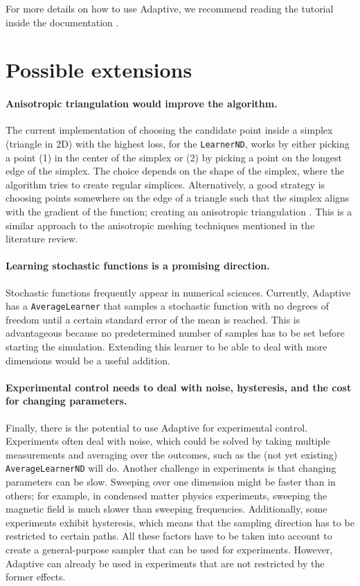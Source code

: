 \documentclass[english, twocolumn, 10pt, aps, superscriptaddress, floatfix, prb, citeautoscript]{revtex4-1}
\renewcommand{\citep}{\cite}
\newcommand{\passthrough}[1]{\lstset{mathescape=false}#1\lstset{mathescape=true}}
\begin{document}
For more details on how to use Adaptive, we recommend reading the tutorial inside the documentation \citep{Nijholt2018}.

\section{Possible extensions}

\paragraph{Anisotropic triangulation would improve the algorithm.}

The current implementation of choosing the candidate point inside a simplex (triangle in 2D) with the highest loss, for the \passthrough{\lstinline!LearnerND!}, works by either picking a point (1) in the center of the simplex or (2) by picking a point on the longest edge of the simplex.
The choice depends on the shape of the simplex, where the algorithm tries to create regular simplices.
Alternatively, a good strategy is choosing points somewhere on the edge of a triangle such that the simplex aligns with the gradient of the function; creating an anisotropic triangulation \citep{Dyn1990}.
This is a similar approach to the anisotropic meshing techniques mentioned in the literature review.

\paragraph{Learning stochastic functions is a promising direction.}

Stochastic functions frequently appear in numerical sciences.
Currently, Adaptive has a \passthrough{\lstinline!AverageLearner!} that samples a stochastic function with no degrees of freedom until a certain standard error of the mean is reached.
This is advantageous because no predetermined number of samples has to be set before starting the simulation.
Extending this learner to be able to deal with more dimensions would be a useful addition.

\paragraph{Experimental control needs to deal with noise, hysteresis, and the cost for changing parameters.}

Finally, there is the potential to use Adaptive for experimental control.
Experiments often deal with noise, which could be solved by taking multiple measurements and averaging over the outcomes, such as the (not yet existing) \passthrough{\lstinline!AverageLearnerND!} will do.
Another challenge in experiments is that changing parameters can be slow.
Sweeping over one dimension might be faster than in others; for example, in condensed matter physics experiments, sweeping the magnetic field is much slower than sweeping frequencies.
Additionally, some experiments exhibit hysteresis, which means that the sampling direction has to be restricted to certain paths.
All these factors have to be taken into account to create a general-purpose sampler that can be used for experiments.
However, Adaptive can already be used in experiments that are not restricted by the former effects.
\end{document}
